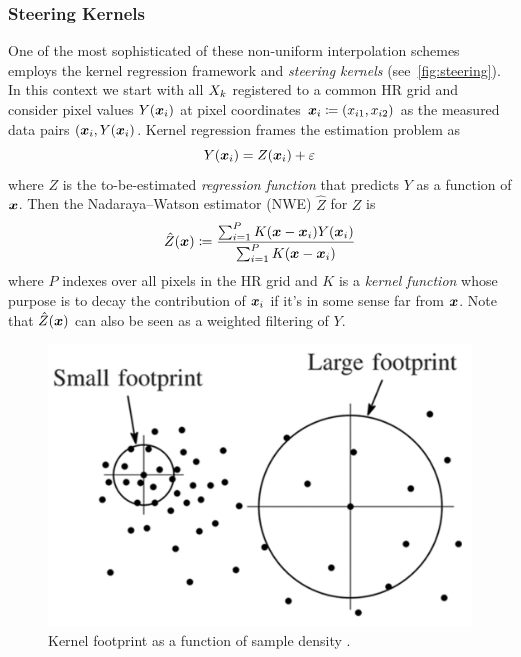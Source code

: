 \subsubsection{Steering Kernels}
One of the most sophisticated of these non-uniform interpolation schemes employs the kernel regression framework and \textit{steering kernels} (see~\ref{fig:steering}).
%
In this context we start with all \(X_k\) registered to a common HR grid and consider pixel values \(Y(\bm{x}_i)\) at pixel coordinates \(\bm{x}_i \coloneqq (x_{i1},x_{i2})\) as the measured data pairs \((\bm{x}_i, Y(\bm{x}_i)\).
%
Kernel regression frames the estimation problem as
\begin{equation}
    Y(\bm{x}_i) = Z(\bm{x}_i) + \varepsilon
\end{equation}
where \(Z\) is the to-be-estimated \textit{regression function} that predicts \(Y\) as a function of \(\bm{x}\).
Then the Nadaraya–Watson estimator (NWE) \cite{Nadaraya} \(\hat{Z}\) for \(Z\) is
\begin{equation}
    \hat{Z}(\bm{x}) \coloneqq \frac{\sum_{i=1}^{P}K(\bm{x} - \bm{x}_i)Y(\bm{x}_i)}{\sum_{i=1}^{P}K(\bm{x} - \bm{x}_i)}
    \label{eqn:kernelregression}
\end{equation}
where \(P\) indexes over all pixels in the HR grid and \(K\) is a \textit{kernel function} whose purpose is to decay the contribution of \(\bm{x}_i\) if it's in some sense far from \(\bm{x}\).
%
Note that \(\hat{Z}(\bm{x})\) can also be seen as a weighted filtering of \(Y\).
%
\begin{figure}
    \centering
    \includegraphics[width=.8\linewidth]{figures/classical/footprint.png}
    \caption{Kernel footprint as a function of sample density \cite{Takeda2007}.}
    \label{fig:footprint}
\end{figure}
